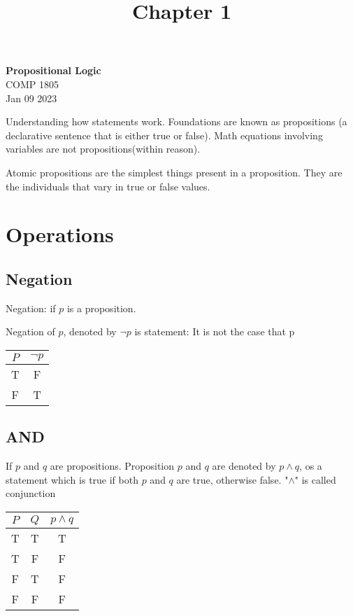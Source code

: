 \documentclass[11pt]{article}
\theoremstyle{definition}
\newcommand\chaptercounter{1}
\begin{document}
\title{Chapter \chaptercounter}
\thispagestyle{empty}

\begin{center}
{\LARGE \bf Propositional Logic}\\
{\large COMP 1805}\\
Jan 09 2023
\end{center}

Understanding how statements work. Foundations are known as propositions (a declarative sentence that is either true or false). Math equations involving variables are not propositions(within reason).

Atomic propositions are the simplest things present in a proposition. They are the individuals that vary in true or false values. 
\section{Operations}
\subsection{Negation}
Negation: if $p$ is a proposition.

Negation of $p$, denoted by $\neg p $ is statement: It is not the case that p
\begin{center}
	\begin{tabular}{ |c|c| } 
 		\hline
 		$P$ & $\neg p$ \\
		\hline
 		T & F \\
 		F & T \\
 		\hline
	\end{tabular}
\end{center}
\subsection{AND}
If $p$ and $q$ are propositions. Proposition $p$ and $q$ are denoted by $p \land q$, os a statement which is true if both $p$ and $q$ are true, otherwise false. "$\land$" is called conjunction
\begin{center}
	\begin{tabular}{ |c|c|c| } 
 		\hline
 		$P$ & $Q$ & $p \land q$\\
		\hline
 		T & T  & T\\
 		T & F & F\\
		F & T & F\\
		F & F & F \\
 		\hline
	\end{tabular}
\end{center}
\end{document}
